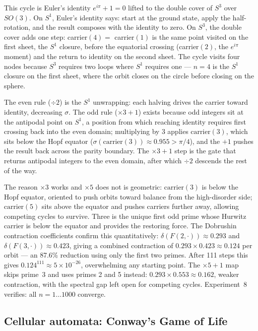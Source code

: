 \documentclass[12pt,a4paper]{article}
\theoremstyle{definition}
\theoremstyle{remark}
\begin{document}
This cycle is Euler's identity $e^{i\pi} + 1 = 0$ lifted to the double cover
of $S^3$ over $SO(3)$. On $S^1$, Euler's identity says: start at the ground
state, apply the half-rotation, and the result composes with the identity to
zero. On $S^3$, the double cover adds one step: carrier$(4) = $ carrier$(1)$
is the same point visited on the first sheet, the $S^1$ closure, before
the equatorial crossing (carrier$(2)$, the $e^{i\pi}$ moment) and the
return to identity on the second sheet. The cycle visits four nodes because
$S^3$ requires two loops where $S^1$ requires one --- $n = 4$ is the $S^1$
closure on the first sheet, where the orbit closes on the circle before
closing on the sphere.

The even rule ($\div 2$) is the $S^1$ unwrapping: each halving drives the
carrier toward identity, decreasing $\sigma$. The odd rule ($\times 3 + 1$)
exists because odd integers sit at the antipodal point on $S^1$, a position
from which reaching identity requires first crossing back into the even
domain; multiplying by 3 applies $\mathrm{carrier}(3)$, which sits below the
Hopf equator ($\sigma(\mathrm{carrier}(3)) \approx 0.955 > \pi/4$), and the
$+1$ pushes the result back across the parity boundary. The $\times 3 + 1$
step is the gate that returns antipodal integers to the even domain, after
which $\div 2$ descends the rest of the way.

The reason $\times 3$ works and $\times 5$ does not is geometric:
$\mathrm{carrier}(3)$ is below the Hopf equator, oriented to push orbits
toward balance from the high-disorder side; $\mathrm{carrier}(5)$ sits above
the equator and pushes carriers further away, allowing competing cycles to
survive. Three is the unique first odd prime whose Hurwitz carrier is below the equator
and provides the restoring force. The Dobrushin contraction coefficients
confirm this quantitatively: $\delta(F(2,\cdot)) \approx 0.293$ and
$\delta(F(3,\cdot)) \approx 0.423$, giving a combined contraction of
$0.293 \times 0.423 \approx 0.124$ per orbit --- an 87.6\% reduction using
only the first two primes. After 111 steps this gives $0.124^{111} \approx 5
\times 10^{-26}$, overwhelming any starting point. The $\times 5 + 1$ map
skips prime~3 and uses primes 2 and 5 instead: $0.293 \times 0.553 \approx
0.162$, weaker contraction, with the spectral gap left open for competing
cycles. Experiment~8 verifies: all $n = 1 \ldots 1000$ converge.

\subsection{Cellular automata: Conway's Game of Life}
\end{document}
